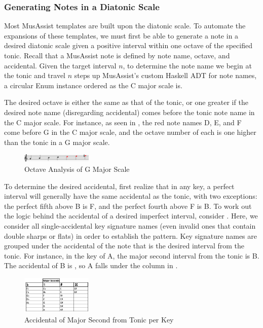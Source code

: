 \documentclass{article}
\begin{document}
\subsubsection{Generating Notes in a Diatonic Scale}
\label{sec:note_generate}
Most MusAssist templates are built upon the diatonic scale. To automate the expansions of these templates, we must first be able to generate a note in a desired diatonic scale given a positive interval within one octave of the specified tonic. Recall that a MusAssist note is defined by note name, octave, and accidental. Given the target interval $n$, to determine the note name we begin at the tonic and travel $n$ steps up MusAssist’s custom Haskell ADT for note names, a circular Enum instance ordered as the C major scale is. 

The desired octave is either the same as that of the tonic, or one greater if the desired note name (disregarding accidental) comes before the tonic note name in the C major scale. For instance, as seen in , the red note names D, E, and F come before G in the C major scale, and the octave number of each is one higher than the tonic in a G major scale.

\vspace{-2mm}
\begin{figure}[h!]
\centering
\includegraphics[width=0.3\textwidth]{images/note_octave_logic}
\caption{\centering Octave Analysis of G Major Scale}
\label{note_octaves}
\vspace{-3mm}
\end{figure}

To determine the desired accidental, first realize that in any key, a perfect interval will generally have the same accidental as the tonic, with two exceptions: the perfect fifth above B is F\musSharp, and the perfect fourth above F is B\musFlat. To work out the logic behind the accidental of a desired imperfect interval, consider . Here, we consider all single-accidental key signature names (even invalid ones that contain double sharps or flats) in order to establish the pattern. Key signature names are grouped under the accidental of the note that is the desired interval from the tonic. For instance, in the key of A\musFlat\;, the major second interval from the tonic is B\musFlat. The accidental of B\musFlat\; is \musFlat, so A\musFlat\; falls under the \musFlat\; column in .
\vspace{-2mm}
\begin{figure}[h!]
\centering
\includegraphics[width=0.3\textwidth]{images/maj_seconds}
\caption{Accidental of Major Second from Tonic per Key}
\label{maj_seconds}
\vspace{-2mm}
\end{figure}
\end{document}
